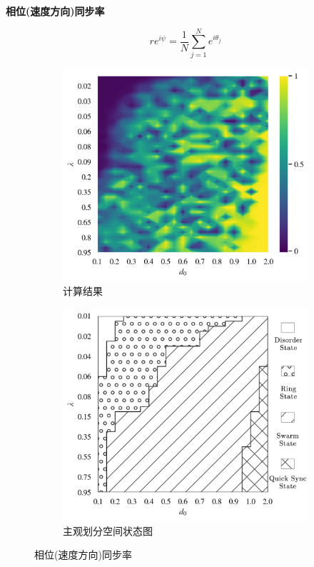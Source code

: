 \documentclass{article}
\begin{document}
\noindent\textbf{相位(速度方向)同步率}

$$
r e^{i\psi}=\frac{1}{N}\sum_{j=1}^{N}{e^{i\theta _j}}
$$

\begin{figure}[H]
	\centering
	\begin{subfigure}[b]{0.49\textwidth}
		\includegraphics[width=\textwidth]{./figs/phaseSyncOp.png}
		\vspace{-1cm}
		\caption{计算结果}
	\end{subfigure}
	\begin{subfigure}[b]{0.49\textwidth}
		\includegraphics[width=\textwidth]{./figs/subjectiveOp3.png}
		\vspace{-1cm}
		\caption{主观划分空间状态图}
	\end{subfigure}
	\vspace{-0.5cm}
	\caption{相位(速度方向)同步率}
	\label{fig:fig234c.1}
\end{figure}
\end{document}
